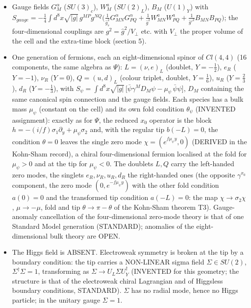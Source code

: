 \documentclass[11pt]{article}
\begin{document}
\begin{itemize}
\item Gauge fields $G^\alpha_M$ ($SU(3)_c$), $W^a_M$ ($SU(2)_L$), $B_M$ ($U(1)_Y$) with $S_{gauge} = -\frac14\int d^8x\sqrt{|g|}\, g^{MP}g^{NQ}\big(\frac{1}{\hat g_s^2}G^\alpha_{MN}G^\alpha_{PQ} + \frac{1}{\hat g^2}W^a_{MN}W^a_{PQ} + \frac{1}{\hat g'^2}B_{MN}B_{PQ}\big)$; the four-dimensional couplings are $g^2 = \hat g^2/V_\perp$ etc. with $V_\perp$ the proper volume of the cell and the extra-time block (section 5).
\item One generation of fermions, each an eight-dimensional spinor of $Cl(4,4)$ (16 components, the same algebra as $\Psi$): $L = (\nu, e)_L$ (doublet, $Y = -\frac12$), $e_R$ ($Y = -1$), $\nu_R$ ($Y = 0$), $Q = (u, d)_L$ (colour triplet, doublet, $Y = \frac16$), $u_R$ ($Y = \frac23$), $d_R$ ($Y = -\frac13$), with $S_\psi = \int d^8x\sqrt{|g|}\,\big[\bar\psi\gamma^M D_M\psi - \mu_\psi\,\bar\psi\psi\big]$, $D_M$ containing the same canonical spin connection and the gauge fields. Each species has a bulk mass $\mu_\psi$ (constant on the cell) and its own fold condition $\theta_\psi$ (INVENTED assignment): exactly as for $\Psi$, the reduced $x_0$ operator is the block $h = -(i/f)\sigma_1\partial_y + \mu_\psi\sigma_2$ and, with the regular tip $b(-L) = 0$, the condition $\theta = 0$ leaves the single zero mode $\chi = (e^{f\mu_\psi y}, 0)$ (DERIVED in the Kohn-Sham record), a chiral four-dimensional fermion localised at the fold for $\mu_\psi > 0$ and at the tip for $\mu_\psi < 0$. The doublets $L, Q$ carry the left-handed zero modes, the singlets $e_R, \nu_R, u_R, d_R$ the right-handed ones (the opposite $\gamma^{x_0}$ component, the zero mode $(0, e^{-f\mu_\psi y})$ with the other fold condition $a(0) = 0$ and the transformed tip condition $a(-L) = 0$: the map $\chi \to \sigma_2\chi$, $\mu \to -\mu$, fold and tip $\theta \to \pi - \theta$ of the Kohn-Sham theorem T3). Gauge-anomaly cancellation of the four-dimensional zero-mode theory is that of one Standard Model generation (STANDARD); anomalies of the eight-dimensional bulk theory are OPEN.
\item The Higgs field is ABSENT. Electroweak symmetry is broken at the tip by a boundary condition: the tip carries a NON-LINEAR sigma field $\Sigma \in SU(2)$, $\Sigma^\dagger\Sigma = 1$, transforming as $\Sigma \to U_L\Sigma U_Y^\dagger$ (INVENTED for this geometry; the structure is that of the electroweak chiral Lagrangian and of Higgsless boundary conditions, STANDARD). $\Sigma$ has no radial mode, hence no Higgs particle; in the unitary gauge $\Sigma = 1$.
\end{itemize}
\end{document}
